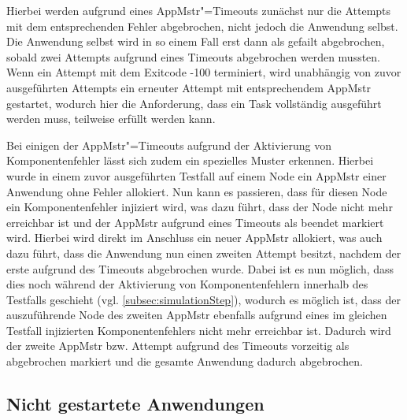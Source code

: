 Hierbei werden aufgrund eines \gls{AppMstr}"=Timeouts zunächst nur die \glspl{Attempt} mit dem entsprechenden Fehler abgebrochen, nicht jedoch die \gls{Anwendung} selbst.
Die \gls{Anwendung} selbst wird in so einem Fall erst dann als gefailt abgebrochen, sobald zwei \glspl{Attempt} aufgrund eines Timeouts abgebrochen werden mussten.
Wenn ein \gls{Attempt} mit dem Exitcode -100 terminiert, wird unabhängig von zuvor ausgeführten \glspl{Attempt} ein erneuter \gls{Attempt} mit entsprechendem \gls{AppMstr} gestartet, wodurch hier die Anforderung, dass ein Task vollständig ausgeführt werden muss, teilweise erfüllt werden kann.

Bei einigen der \gls{AppMstr}"=Timeouts aufgrund der Aktivierung von Komponentenfehler lässt sich zudem ein spezielles Muster erkennen.
Hierbei wurde in einem zuvor ausgeführten \gls{Testfall} auf einem Node ein \gls{AppMstr} einer \gls{Anwendung} ohne Fehler allokiert.
Nun kann es passieren, dass für diesen Node ein Komponentenfehler injiziert wird, was dazu führt, dass der Node nicht mehr erreichbar ist und der \gls{AppMstr} aufgrund eines Timeouts als beendet markiert wird.
Hierbei wird direkt im Anschluss ein neuer \gls{AppMstr} allokiert, was auch dazu führt, dass die \gls{Anwendung} nun einen zweiten \gls{Attempt} besitzt, nachdem der erste aufgrund des Timeouts abgebrochen wurde.
Dabei ist es nun möglich, dass dies noch während der Aktivierung von Komponentenfehlern innerhalb des Testfalls geschieht (vgl. \cref{subsec:simulationStep}), wodurch es möglich ist, dass der auszuführende Node des zweiten \gls{AppMstr} ebenfalls aufgrund eines im gleichen \gls{Testfall} injizierten Komponentenfehlers nicht mehr erreichbar ist.
Dadurch wird der zweite \gls{AppMstr} bzw. \gls{Attempt} aufgrund des Timeouts vorzeitig als abgebrochen markiert und die gesamte \gls{Anwendung} dadurch abgebrochen.

\subsection{Nicht gestartete Anwendungen}
\label{subsec:notStartedApps}

